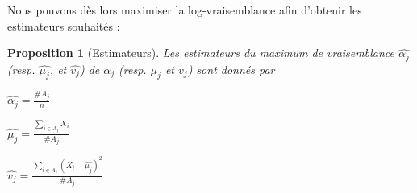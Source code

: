 \documentclass[frenchb]{report}
\newcommand{\1}{\mathbbm{1}}
\newtheorem{prop}{Proposition}
\theoremstyle{definition}\newtheorem{defn}{Définition}
\theoremstyle{definition}\newtheorem{exm}{Exemple}
\theoremstyle{definition}\newtheorem{nota}{Notation}
\theoremstyle{definition}\newtheorem{rem}{Remarque}
\begin{document}
Nous pouvons dès lors maximiser la log-vraisemblance afin d'obtenir les estimateurs souhaités :
\begin{prop}[Estimateurs]
Les estimateurs du maximum de vraisemblance $\widehat{\alpha_j}$ (resp. $\widehat{\mu_j}$, et $\widehat{v_j}$) de $\alpha_j$ (resp. $\mu_j$ et $v_j$) sont donnés par
\begin{center}
$\widehat{\alpha_j} = \frac{\#A_j}{n}$
\end{center}
\begin{center}
$ \widehat{\mu_j} = \displaystyle\frac{\sum_{i\in A_j} X_i}{\#A_j} $
\end{center}
\begin{center}
$ \widehat{v_j} = \displaystyle \frac{\sum_{i\in A_j}(X_i - \widehat{\mu_j})^2}{\#A_j}$
\end{center}
\end{prop}
\newpage
\end{document}
